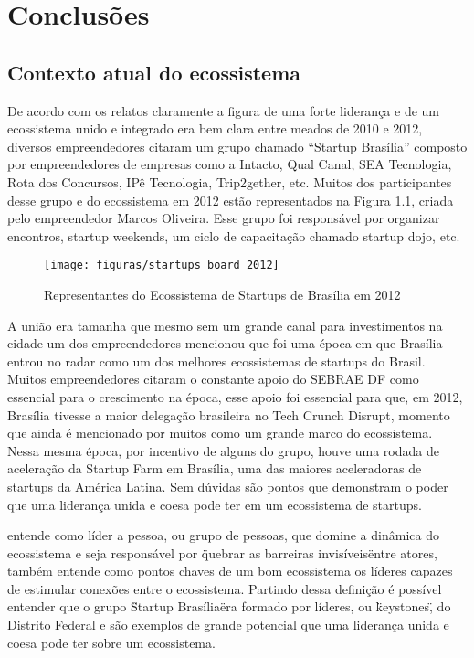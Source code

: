 \chapter[Conclusões]{Conclusões}
\label{cap-conclusoes}

\section{Contexto atual do ecossistema}
\label{contexto_atual_do_ecosssistema}

De acordo com os relatos claramente a figura de uma forte liderança e de um ecossistema unido e integrado era bem clara entre meados de 2010 e 2012, diversos empreendedores citaram um grupo chamado ``Startup Brasília'' composto por empreendedores de empresas como a Intacto, Qual Canal, SEA Tecnologia, Rota dos Concursos, IPê Tecnologia, Trip2gether, etc. Muitos dos participantes desse grupo e do ecossistema em 2012 estão representados na Figura \ref{figure:startups_board_2012}, criada pelo empreendedor Marcos Oliveira. Esse grupo foi responsável por organizar encontros, startup weekends, um ciclo de capacitação chamado startup dojo, etc.

\begin{figure}[!htb]
	\centering
	\texttt{[image: figuras/startups\_board\_2012]}
	\caption{Representantes do Ecossistema de Startups de Brasília em 2012}
	\label{figure:startups_board_2012}
\end{figure} 

A união era tamanha que mesmo sem um grande canal para investimentos na cidade um dos empreendedores mencionou que foi uma época em que Brasília entrou no radar como um dos melhores ecossistemas de startups do Brasil. Muitos empreendedores citaram o constante apoio do SEBRAE DF como essencial para o crescimento na época, esse apoio foi essencial para que, em 2012, Brasília tivesse a maior delegação brasileira no Tech Crunch Disrupt, momento que ainda é mencionado por muitos como um grande marco do ecossistema. Nessa mesma época, por incentivo de alguns do grupo, houve uma rodada de aceleração da Startup Farm em Brasília, uma das maiores aceleradoras de startups da América Latina. Sem dúvidas são pontos que demonstram o poder que uma liderança unida e coesa pode ter em um ecossistema de startups.

 entende como líder a pessoa, ou grupo de pessoas, que domine a dinâmica do ecossistema e seja responsável por \"quebrar as barreiras invisíveis\" entre atores,  também entende como pontos chaves de um bom ecossistema os líderes capazes de estimular conexões entre o ecossistema. Partindo dessa definição é possível entender que o grupo \"Startup Brasília\" era formado por líderes, ou \"keystones\", do Distrito Federal e são exemplos de grande potencial que uma liderança unida e coesa pode ter sobre um ecossistema.

